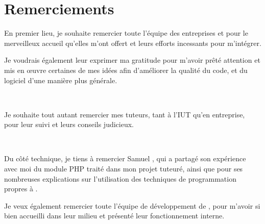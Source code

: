 \chapter*{Remerciements}
En premier lieu, je souhaite remercier toute l'équipe des entreprises \solulog{} et \fidit{} pour le merveilleux accueil qu'elles m'ont offert et leurs efforts incessants pour m'intégrer.

Je voudrais également leur exprimer ma gratitude pour m'avoir prêté attention et mis en \oe{uvre} certaines de mes idées afin d'améliorer la qualité du code, et du logiciel d'une manière plus générale.

~

Je souhaite tout autant remercier mes tuteurs, tant à l'IUT qu'en entreprise, pour leur suivi et leurs conseils judicieux.

~

Du côté technique, je tiens à remercier Samuel , qui a partagé son expérience avec moi du module PHP traité dans mon projet tuteuré, ainsi que pour ses nombreuses explications sur l'utilisation des techniques de programmation propres à \solulog.

Je veux également remercier toute l'équipe de développement de \fidit, pour m'avoir si bien accueilli dans leur milieu et présenté leur fonctionnement interne.
